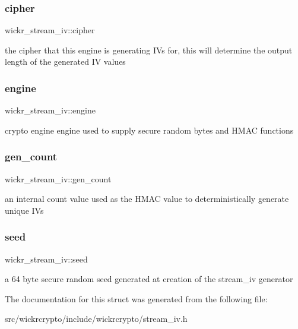 \subsubsection{\texorpdfstring{cipher}{cipher}}
{\footnotesize\ttfamily wickr\+\_\+stream\+\_\+iv\+::cipher}

the cipher that this engine is generating IV\textquotesingle{}s for, this will determine the output length of the generated IV values \mbox{\label{structwickr__stream__iv_a8c597718ade583db19204df7bfed7e85}} 
\subsubsection{\texorpdfstring{engine}{engine}}
{\footnotesize\ttfamily wickr\+\_\+stream\+\_\+iv\+::engine}

crypto engine engine used to supply secure random bytes and H\+M\+AC functions \mbox{\label{structwickr__stream__iv_ae7d500c34333c546ee044fe875e10dfc}} 
\subsubsection{\texorpdfstring{gen\+\_\+count}{gen\_count}}
{\footnotesize\ttfamily wickr\+\_\+stream\+\_\+iv\+::gen\+\_\+count}

an internal count value used as the H\+M\+AC value to deterministically generate unique I\+Vs \mbox{\label{structwickr__stream__iv_a221017bc41b4cc36bf31f13a0c299db1}} 
\subsubsection{\texorpdfstring{seed}{seed}}
{\footnotesize\ttfamily wickr\+\_\+stream\+\_\+iv\+::seed}

a 64 byte secure random seed generated at creation of the stream\+\_\+iv generator 

The documentation for this struct was generated from the following file\+:\begin{DoxyCompactItemize}
\item 
src/wickrcrypto/include/wickrcrypto/stream\+\_\+iv.\+h\end{DoxyCompactItemize}
